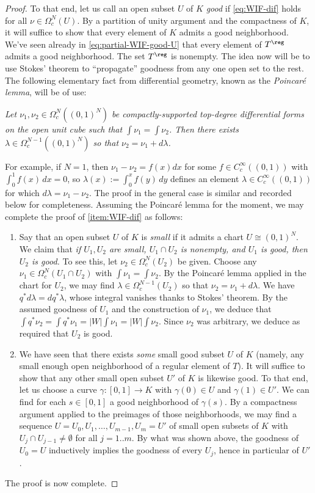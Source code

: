\documentclass[reqno]{amsart} 
\begin{document}
\begin{proof}
  To that end, let us call an open subset $U$ of $K$ \emph{good} if \eqref{eq:WIF-dif} holds for all $\nu \in \Omega_c^N(U)$.  By a partition of unity argument and the compactness of $K$, it will suffice to show that every element of $K$ admits a good neighborhood.  We've seen already in \eqref{eq:partial-WIF-good-U} that every element of $T^{\reg}$ admits a good neighborhood.  The set $T^{\reg}$ is nonempty.  The idea now will be to use Stokes' theorem to ``propagate'' goodness from any one open set to the rest.  The following elementary fact from differential geometry, known as the \emph{Poincar{\'e} lemma}, will be of use:
  \begin{center}
    \emph{Let $\nu_1, \nu_2 \in \Omega_c^N((0,1)^N)$ be compactly-supported top-degree differential forms on the open unit cube such that $\int \nu_1 = \int \nu_2$.  Then there exists $\lambda \in \Omega_c^{N-1}((0,1)^N)$ so that $\nu_2 = \nu_1 + d \lambda$.}
  \end{center}
  For example, if $N = 1$, then $\nu_1 - \nu_2 = f(x) d x$ for some $f \in C_c^\infty((0,1))$ with $\int_0^1 f(x) \, d x = 0$, so $\lambda(x) := \int_{0}^x f(y) \, d y$ defines an element $\lambda \in C_c^\infty((0,1))$ for which $d \lambda = \nu_1 - \nu_2$.  The proof in the general case is similar and recorded below for completeness.  Assuming the Poincar{\'e} lemma for the moment, we may complete the proof of \ref{item:WIF-dif} as follows:
  \begin{enumerate}
  \item Say that an open subset $U$ of $K$ is \emph{small} if it admits a chart $U \cong (0,1)^N$.  We claim that \emph{if $U_1, U_2$ are small, $U_1 \cap U_2$ is nonempty, and $U_1$ is good, then $U_2$ is good.}  To see this, let $\nu_2 \in \Omega_c^N(U_2)$ be given.  Choose any $\nu_1 \in \Omega_c^N(U_1 \cap U_2)$ with $\int \nu_1 = \int \nu_2$.  By the Poincar{\'e} lemma applied in the chart for $U_2$, we may find $\lambda \in \Omega_c^{N-1}(U_2)$ so that $\nu_2 = \nu_1 + d \lambda$.  We have $q^* d \lambda = d q^* \lambda$, whose integral vanishes thanks to Stokes' theorem.  By the assumed goodness of $U_1$ and the construction of $\nu_1$, we deduce that $\int q^* \nu_2 = \int q^* \nu_1 = |W| \int \nu_1 = |W| \int \nu_2$.  Since $\nu_2$ was arbitrary, we deduce as required that $U_2$ is good.
  \item We have seen that there exists \emph{some} small good subset $U$ of $K$ (namely, any small enough open neighborhood of a regular element of $T$).  It will suffice to show that any other small open subset $U'$ of $K$ is likewise good.  To that end, let us choose a curve $\gamma : [0,1] \rightarrow K$ with $\gamma(0) \in U$ and $\gamma(1) \in U'$.  We can find for each $s \in [0,1]$ a good neighborhood of $\gamma(s)$.  By a compactness argument applied to the preimages of those neighborhoods, we may find a sequence $U = U_0, U_1, \dotsc, U_{m-1}, U_m = U'$ of small open subsets of $K$ with $U_j \cap U_{j-1} \neq \emptyset$ for all $j=1..m$.  By what was shown above, the goodness of $U_0 = U$ inductively implies the goodness of every $U_j$, hence in particular of $U'$.
  \end{enumerate}
  The proof is now complete.
\end{proof}
\end{document}

